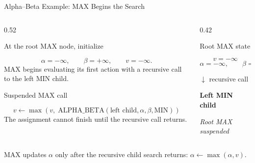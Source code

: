 \documentclass[aspectratio=169,10pt]{beamer}
\begin{document}



\begin{frame}[shrink=18]{Alpha--Beta Example: MAX Begins the Search}

  \begin{columns}[T,onlytextwidth]

    \begin{column}{0.52\textwidth}

      At the root MAX node, initialize

      \[
        \alpha=-\infty,\qquad
        \beta=+\infty,\qquad
        v=-\infty.
      \]
      MAX begins evaluating its first action with a recursive call to the left MIN child.

      \begin{block}{Suspended MAX call}

        \[
          v \leftarrow
          \max\left(
            v,\;
            \text{ALPHA\_BETA}(\text{left child},\alpha,\beta,\text{MIN})
          \right)
        \]
        The assignment cannot finish until the recursive call returns.

      \end{block}

    \end{column}

    \begin{column}{0.42\textwidth}

      \begin{block}{Root MAX state}

        \[
          v=-\infty
        \]
        \[
          \alpha=-\infty,\qquad \beta=+\infty
        \]
      \end{block}

      \begin{center}

        $\downarrow$ recursive call

        \vspace{0.08in}

        \textbf{Left MIN child}

        \vspace{0.08in}

        \textit{Root MAX suspended}

      \end{center}

    \end{column}

  \end{columns}

  \begin{keyidea}

    MAX updates $\alpha$ only after the recursive child search returns:
    $\alpha \leftarrow \max(\alpha,v)$.

  \end{keyidea}

\end{frame}
\end{document}
